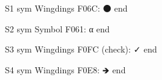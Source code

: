 \documentclass[11pt,a4paper]{article}
\begin{document}
S1 sym Wingdings F06C: ⚫ end

S2 sym Symbol F061: α end

S3 sym Wingdings F0FC (check): ✓ end

S4 sym Wingdings F0E8: 🡺 end
\end{document}
